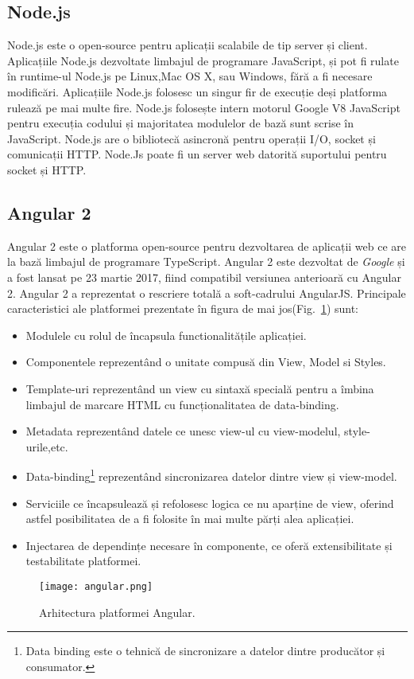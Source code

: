     \subsection{Node.js}
Node.js este o  open-source pentru aplicații scalabile de tip server și client. Aplicațiile Node.js dezvoltate limbajul de programare 
JavaScript, și pot fi rulate în runtime-ul Node.js pe Linux,Mac OS X, sau Windows, fără a fi necesare modificări.
Aplicațiile Node.js folosesc un singur fir de execuție deși platforma rulează pe mai multe fire. Node.js folosește 
intern motorul Google V8 JavaScript pentru execuția codului și majoritatea modulelor de bază sunt scrise în JavaScript. 
Node.js are o bibliotecă asincronă pentru operații I/O, socket și comunicații HTTP. Node.Js poate fi un server web datorită
suportului pentru socket și HTTP.
    \subsection{Angular 2}
Angular 2 este o platforma open-source pentru dezvoltarea de aplicații web ce are la bază limbajul de programare TypeScript. Angular 2 este dezvoltat
de \textit{Google} și a fost lansat pe 23 martie 2017, fiind compatibil versiunea anterioară cu Angular 2. Angular 2 a reprezentat o rescriere totală
a soft-cadrului AngularJS. Principale caracteristici ale platformei prezentate în figura de mai jos(Fig.~\ref{fig:angular}) sunt:
\begin{itemize}
    \item Modulele cu rolul de încapsula functionalitățile aplicației.
    \item Componentele reprezentând o unitate compusă din View, Model si Styles.
    \item Template-uri reprezentând un view cu sintaxă specială pentru a îmbina limbajul de marcare HTML cu funcționalitatea de data-binding.
    \item Metadata reprezentând datele ce unesc view-ul cu view-modelul, style-urile,etc.
    \item Data-binding\footnote{Data binding este o tehnică de sincronizare a datelor dintre producător și consumator.} reprezentând sincronizarea datelor dintre view și view-model.
    \item Serviciile ce încapsulează și refolosesc logica ce nu aparține de view, oferind astfel posibilitatea de a fi folosite în mai multe părți alea aplicației.
    \item Injectarea de dependințe necesare în componente, ce oferă extensibilitate și testabilitate platformei.
\end{itemize}
\begin{figure}[h]
\texttt{[image: angular.png]}
\centering
\caption{Arhitectura platformei Angular.}
\label{fig:angular}
\end{figure} 